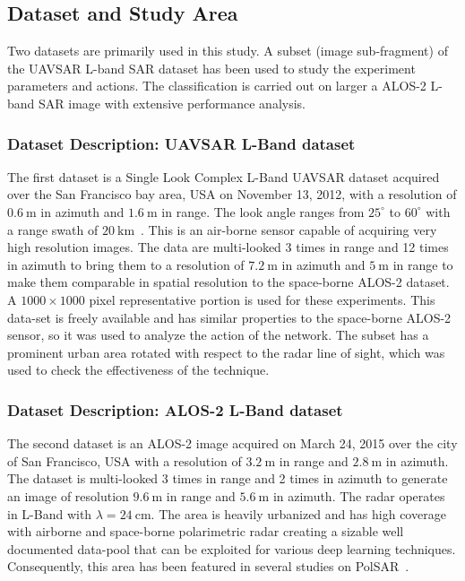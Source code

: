 

\subsection{Dataset and Study Area}
\label{sec:stage4}

 Two datasets are primarily used in this study.  A subset (image sub-fragment) of the UAVSAR L-band SAR dataset has been used to study the experiment parameters and actions. The classification is carried out on larger a ALOS-2 L-band SAR image with extensive performance analysis.
 
 
\subsubsection{Dataset Description: UAVSAR L-Band dataset}

The first dataset is a Single Look Complex L-Band UAVSAR dataset acquired over the San Francisco bay area, USA on November 13, 2012, with a resolution of $\SI{0.6}{\m}$ in azimuth and $\SI{1.6}{\m}$ in range. The look angle ranges from $25^\circ$ to $60^\circ$ with a range swath of $\SI{20}{\km}$~\cite{fore2015uavsar}.   This is an air-borne sensor capable of acquiring very high resolution images. The data are multi-looked 3 times in range and 12 times in azimuth to bring them to a resolution of $\SI{7.2}{\m}$ in azimuth and $\SI{5}{\m}$ in range to make them comparable in spatial resolution to the space-borne ALOS-2 dataset. A $1000\times1000$ pixel representative portion is used for these experiments. This data-set is freely available and has similar properties to the space-borne ALOS-2 sensor, so it was used to analyze the action of the network. The subset has a prominent urban area rotated with respect to the radar line of sight, which was used to check the effectiveness of the technique. 

\subsubsection{Dataset Description: ALOS-2 L-Band dataset}
The second dataset is an ALOS-2 image acquired on March 24, 2015 over the city of San Francisco, USA with a resolution of $\SI{3.2}{\m}$ in range and $\SI{2.8}{\m}$ in azimuth. The dataset is multi-looked 3 times in range and 2 times in azimuth to generate an image of resolution $\SI{9.6}{\m}$ in range and $\SI{5.6}{\m}$ in azimuth. The radar operates in L-Band with $\lambda=\SI{24}{\cm}$. The area is heavily urbanized and has high coverage with airborne and space-borne polarimetric radar creating a sizable well documented data-pool that can be exploited for various deep learning techniques. Consequently, this area has been featured in several studies on PolSAR~\cite{lee2004classification, bhattacharya2015adaptive}.

